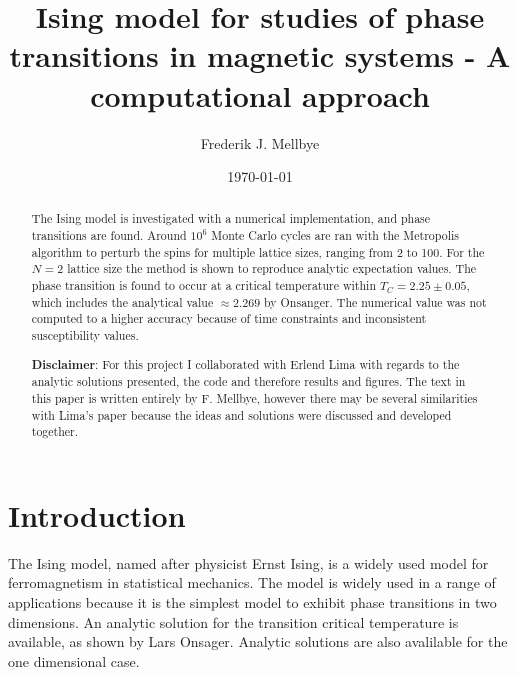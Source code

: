 \documentclass[aps,reprint]{revtex4-1}
\begin{document}
\title{Ising model for studies of phase transitions in magnetic systems - A computational approach}
\author{Frederik J. Mellbye}
\date{\today}

\begin{abstract}\noindent
The Ising model is investigated with a numerical implementation, and phase transitions
are found. Around $10^6$ Monte Carlo cycles are ran with the Metropolis
algorithm to perturb the spins for multiple lattice sizes, ranging from
2 to 100. For the $N = 2$ lattice size the method is shown to reproduce analytic
expectation values. The phase transition is found to occur at a critical temperature
within $T_C = 2.25 \pm 0.05$, which includes the analytical value $\approx 2.269$ by Onsanger.
The numerical value was not computed to a higher accuracy because of time
constraints and inconsistent susceptibility values.

\bigskip
\noindent \textbf{Disclaimer}:
\newline
For this project I collaborated with Erlend Lima with regards to the
analytic solutions presented, the code and therefore results and figures.
The text in this paper is written entirely by F. Mellbye, however there may be
several similarities with Lima's paper because the ideas and solutions
were discussed and developed together.
\end{abstract}
\maketitle
\tableofcontents
\makeatletter
\let\toc@pre\relax
\let\toc@post\relax
\makeatother

\newpage

\section{Introduction} \label{sec:introduction}
The Ising model, named after physicist Ernst Ising, is a widely used model for
ferromagnetism in statistical mechanics. The model is widely used in a range
of applications because it is the simplest model to exhibit phase transitions
in two dimensions. An analytic solution for the transition critical temperature
is available, as shown by Lars Onsager. Analytic solutions are also avalilable
for the one dimensional case.
\end{document}
